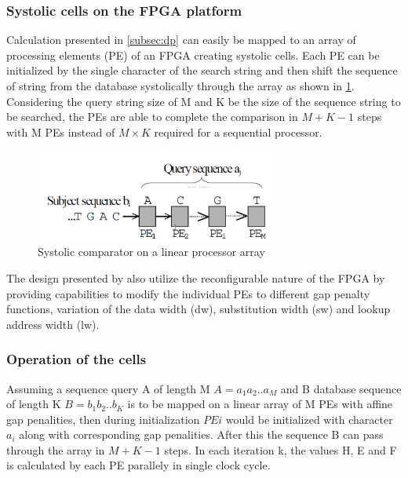 \documentclass[12pt,twoside]{article}
\begin{document}
\subsubsection{Systolic cells on the FPGA platform}

Calculation presented in \cref{subsec:dp} can easily be mapped to an array of processing elements (PE) of an FPGA creating systolic cells.
Each PE can be initialized by the single character of the search string and then shift the sequence of string from the database systolically
through the array as shown in \cref{fig:systollicarray}. Considering the query string size of M and K be the size of the sequence string to be
searched, the PEs are able to complete the comparison in $ M + K-1 $ steps with M PEs instead of $ M \times K $ required for a sequential processor.

\begin{figure}[h]%
    \centering
    \includegraphics[width=0.7\textwidth]{fig/systollicarray}
    \caption{Systolic comparator on a linear processor array \cite[Figure 2]{oliver_hyper_2005}}
    \label{fig:systollicarray}
\end{figure}

The design presented by \textcite{oliver_hyper_2005} also utilize the reconfigurable nature of the FPGA by providing capabilities to modify the 
individual PEs to different gap penalty functions, variation of the data width (dw), substitution width (sw) and lookup address width (lw). 

\subsubsection{Operation of the cells}

Assuming a sequence query A of length M $ A = a_1a_2 .. a_M $ and B database sequence of length K $B = b_1b_2 .. b_K $ is to be mapped on a linear array of
M PEs with affine gap penalities, then during initialization $ PE i $ would be initialized with character $ a_i $ along with corresponding
gap penalities. After this the sequence B can pass through the array in $M+K-1$ steps. In each iteration k, the values H, E and F is calculated by
each PE parallely in single clock cycle. 
\end{document}
